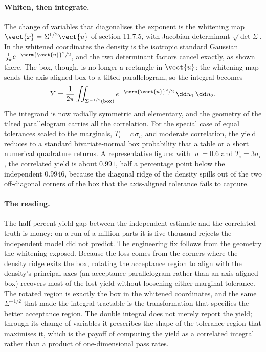 \paragraph{Whiten, then integrate.} The change of variables that
diagonalises the exponent is the whitening map $\vect{x} =
\Sigma^{1/2}\vect{u}$ of section 11.7.5, with Jacobian determinant
$\sqrt{\det\Sigma}$. In the whitened coordinates the density is the
isotropic standard Gaussian $\tfrac{1}{2\pi}e^{-\norm{\vect{u}}^{2}/2}$,
and the two determinant factors cancel exactly, as shown there. The box,
though, is no longer a rectangle in $\vect{u}$: the whitening map sends
the axis-aligned box to a tilted parallelogram, so the integral becomes
\[
Y = \frac{1}{2\pi}\iint_{\Sigma^{-1/2}(\text{box})}
e^{-\norm{\vect{u}}^{2}/2}\,\dd u_{1}\,\dd u_{2}.
\]
The integrand is now radially symmetric and elementary, and the geometry
of the tilted parallelogram carries all the correlation. For the
special case of equal tolerances scaled to the marginals,
$T_{i} = c\,\sigma_{i}$, and moderate correlation, the yield reduces to
a standard bivariate-normal box probability that a table or a short
numerical quadrature returns. A representative figure: with
$\varrho = 0.6$ and $T_{i} = 3\sigma_{i}$, the correlated yield is about
$0.991$, half a percentage point below the independent $0.9946$,
because the diagonal ridge of the density spills out of the two
off-diagonal corners of the box that the axis-aligned tolerance fails to
capture.

\paragraph{The reading.} The half-percent yield gap between the
independent estimate and the correlated truth is money: on a run of a
million parts it is five thousand rejects the independent model did not
predict. The engineering fix follows from the geometry the whitening
exposed. Because the loss comes from the corners where the density ridge
exits the box, rotating the acceptance region to align with the density's
principal axes (an acceptance parallelogram rather than an axis-aligned
box) recovers most of the lost yield without loosening either marginal
tolerance. The rotated region is exactly the box in the whitened
coordinates, and the same $\Sigma^{-1/2}$ that made the integral
tractable is the transformation that specifies the better acceptance
region. The double integral does not merely report the yield; through
its change of variables it prescribes the shape of the tolerance region
that maximises it, which is the payoff of computing the yield as a
correlated integral rather than a product of one-dimensional pass rates.


